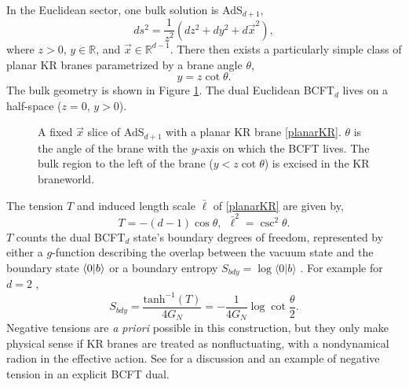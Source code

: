 \documentclass[reprint,amsmath,amssymb,aps,nofootinbib,twocolumn]{revtex4-2}
\begin{document}
In the Euclidean sector, one bulk solution is AdS$_{d+1}$,
\begin{equation}
ds^2 = \frac{1}{z^2}(dz^2 + dy^2 + d\vec{x}^2),\label{met}
\end{equation}
where $z > 0$, $y \in \mathbb{R}$, and $\vec{x} \in \mathbb{R}^{d-1}$. There then exists a particularly simple class of planar KR branes parametrized by a brane angle $\theta$,
\begin{equation}
y = z\cot\theta.\label{planarKR}
\end{equation}
The bulk geometry is shown in Figure \ref{figs:planarBrane}. The dual Euclidean BCFT$_d$ lives on a half-space ($z = 0$, $y > 0$).

\begin{figure}


\caption{A fixed $\vec{x}$ slice of AdS$_{d+1}$ with a planar KR brane \eqref{planarKR}. $\theta$ is the angle of the brane with the $y$-axis on which the BCFT lives. The bulk region to the left of the brane ($y < z\cot\theta$) is excised in the KR braneworld.}

\label{figs:planarBrane}
\end{figure}

The tension $T$ and induced length scale $\bar{\ell}$ of \eqref{planarKR} are given by,
\begin{equation}
T = -(d-1)\cos\theta,\ \ \bar{\ell}^2 = \csc^2\theta.
\end{equation}
$T$ counts the dual BCFT$_d$ state's boundary degrees of freedom, represented by either a $g$-function describing the overlap between the vacuum state and the boundary state $\bra{0}\ket{b}$ or a boundary entropy $S_{bdy} = \log{\langle 0 \lvert b \rangle}$ \cite{Affleck:1991tk,Azeyanagi:2007qj}. For example for $d = 2$ \cite{Takayanagi:2011zk},
\begin{equation}
S_{bdy} = \frac{\text{tanh}^{-1}{(T)}}{4G_{N}} = -\frac{1}{4G_{N}}\log\cot\frac{\theta}{2}.\label{bdryEntropy}
\end{equation}
Negative tensions are \textit{a priori} possible in this construction, but they only make physical sense if KR branes are treated as nonfluctuating, with a nondynamical radion in the effective action. See \cite{Karch:2020flx} for a discussion and an example of negative tension in an explicit BCFT dual.
\end{document}
